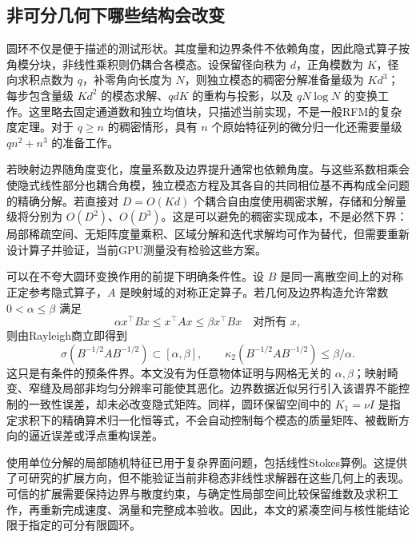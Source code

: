 \subsection{非可分几何下哪些结构会改变}
\label{sec:geometry-scope}

圆环不仅是便于描述的测试形状。其度量和边界条件不依赖角度，因此隐式算子按角模分块，非线性乘积则仍耦合各模态。设保留径向秩为 $d$，正角模数为 $K$，径向求积点数为 $q$，补零角向长度为 $N$，则独立模态的稠密分解准备量级为 $Kd^3$；每步包含量级 $Kd^2$ 的模态求解、$qdK$ 的重构与投影，以及 $qN\log N$ 的变换工作。这里略去固定通道数和独立均值块，只描述当前实现，不是一般RFM的复杂度定理。对于 $q\geq n$ 的稠密情形，具有 $n$ 个原始特征列的微分归一化还需要量级 $qn^2+n^3$ 的准备工作。

若映射边界随角度变化，度量系数及边界提升通常也依赖角度。与这些系数相乘会使隐式线性部分也耦合角模，独立模态方程及其各自的共同相位基不再构成全问题的精确分解。若直接对 $D=O(Kd)$ 个耦合自由度使用稠密求解，存储和分解量级将分别为 $O(D^2)$、$O(D^3)$。这是可以避免的稠密实现成本，不是必然下界：局部稀疏空间、无矩阵度量乘积、区域分解和迭代求解均可作为替代，但需要重新设计算子并验证，当前GPU测量没有检验这些方案。

可以在不夸大圆环变换作用的前提下明确条件性。设 $B$ 是同一离散空间上的对称正定参考隐式算子，$A$ 是映射域的对称正定算子。若几何及边界构造允许常数 $0<\alpha\leq\beta$ 满足
\begin{equation}
 \alpha x^\top Bx\leq x^\top Ax\leq\beta x^\top Bx
 \quad\text{对所有 }x,
 \label{eq:geometry-equivalence}
\end{equation}
则由Rayleigh商立即得到
\begin{equation}
 \sigma(B^{-1/2}AB^{-1/2})\subset[\alpha,\beta],\qquad
 \kappa_2(B^{-1/2}AB^{-1/2})\leq\beta/\alpha.
 \label{eq:geometry-condition}
\end{equation}
这只是有条件的预条件界。本文没有为任意物体证明与网格无关的 $\alpha,\beta$；映射畸变、窄缝及局部非均匀分辨率可能使其恶化。边界数据近似另行引入该谱界不能控制的一致性误差，却未必改变隐式矩阵。同样，圆环保留空间中的 $K_1=\nu I$ 是指定求积下的精确算术归一化恒等式，不会自动控制每个模态的质量矩阵、被截断方向的逼近误差或浮点重构误差。

使用单位分解的局部随机特征已用于复杂界面问题，包括线性Stokes算例\cite{r20}。这提供了可研究的扩展方向，但不能验证当前非稳态非线性求解器在这些几何上的表现。可信的扩展需要保持边界与散度约束，与确定性局部空间比较保留维数及求积工作，再重新完成速度、涡量和完整成本验收。因此，本文的紧凑空间与核性能结论限于指定的可分有限圆环。


